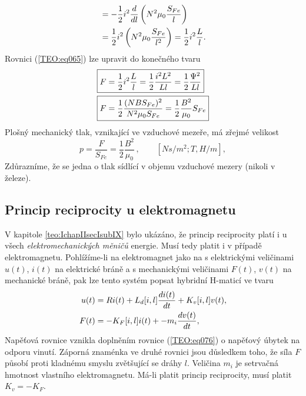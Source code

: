 {\begin{align}
         &= -\frac{1}{2}i^2\dfrac{d  }{d l}\left(N^2\mu_0\frac{S_{Fe}}{l}\right)        \nonumber \\
         &=  \frac{1}{2}i^2\left(N^2\mu_0\frac{S_{Fe}}{l^2}\right)
          =  \frac{1}{2}i^2\frac{L}{l}.                                           \label{TEO:eq065}
      \end{align}
      Rovnici (\ref{TEO:eq065}) lze upravit do konečného tvaru
      \begin{subequations}
        \begin{align}  %
           \Aboxed{F &= \frac{1}{2}i^2\frac{L}{l}    
                      = \frac{1}{2}\frac{i^2L^2}{Ll}
                      = \frac{1}{2}\frac{\Psi^2}{Ll}}                     \label{TEO:eq069a} \\
           \Aboxed{F &= \frac{1}{2}\frac{(NBS_{Fe})^2}{N^2\mu_0S_{Fe}}
                      = \frac{1}{2}\frac{B^2}{\mu_0}S_{Fe}}               \label{TEO:eq069b}
        \end{align}
      \end{subequations}
      Plošný mechanický tlak, vznikající ve vzduchové mezeře, má zřejmé velikost 
      \begin{equation}\label{TEO:eq068}
        \boxed{p = \frac{F}{S_{Fe}} = \frac{1}{2}\frac{B^2}{\mu_0}}\,, \qquad [Ns/m^2; T, H/m],
      \end{equation}
      Zdůrazníme, že se jedna o tlak sídlící v objemu vzduchové mezery (nikoli v železe).
      
    \subsection{Princip reciprocity u elektromagnetu}
      V kapitole \ref{teo:IchapIIsecIsubIX} bylo ukázáno, že princip reciprocity platí i u všech 
      \emph{elektromechanických měničů} energie. Musí tedy platit i v případě elektromagnetu. 
      Pohlížíme-li na elektromagnet jako na  s elektrickými veličinami 
      \(u(t)\), \(i(t)\) na elektrické bráně a s mechanickými veličinami \(F(t)\), \(v(t)\) na 
      mechanické bráně, pak lze tento systém popsat hybridní H-maticí ve tvaru
      \begin{subequations}
      \label{TEO:eq075}
        \begin{align}
          u(t) &= Ri(t) + L_d[i,l]\dfrac{d i(t)}{d t} + K_v[i,l]v(t),  \label{TEO:eq075a} \\
          F(t) &= - K_F[i,l]i(t) + -m_i\dfrac{d v(t)}{d t},            \label{TEO:eq075b} 
        \end{align}
      \end{subequations}
      Napěťová rovnice vznikla doplněním rovnice (\ref{TEO:eq076}) o napěťový úbytek na odporu 
      vinutí. Záporná znaménka ve druhé rovnici jsou důsledkem toho, že síla \(F\) působí proti 
      kladnému smyslu zvětšující se dráhy \(l\). Veličina \(m_i\) je setrvačná hmotnost vlastního 
      elektromagnetu. Má-li platit princip reciprocity, musí platit \(K_v = - K_F\).
      
}
